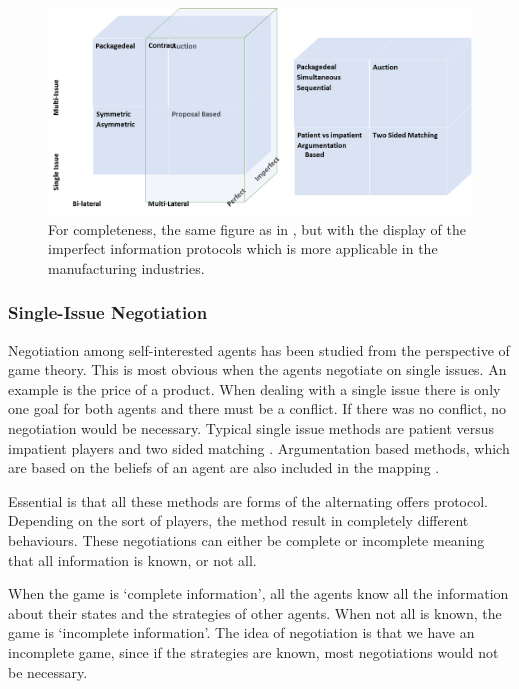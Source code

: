 \begin{figure}[h]
	\centering
	\includegraphics[width=0.9\linewidth]{img/mapping_nego2}
	\caption{For completeness, the same figure as in , but with the display of the imperfect information protocols which is more applicable in the manufacturing industries.}
	\label{fig:mapping_nego2}
\end{figure}

\subsubsection{Single-Issue Negotiation}

Negotiation among self-interested agents has been studied from the perspective of game theory. This is most obvious when the agents negotiate on single issues. An example is the price of a product. When dealing with a single issue there is only one goal for both agents and there must be a conflict. If there was no conflict, no negotiation would be necessary. Typical single issue methods are patient versus impatient players and two sided matching \citep{fatima2014principles}. Argumentation based methods, which are based on the beliefs of an agent are also included in the mapping \citep{li2013automated}.

Essential is that all these methods are forms of the alternating offers protocol. Depending on the sort of players, the method result in completely different behaviours. These negotiations can either be complete or incomplete meaning that all information is known, or not all. 

When the game is `complete information', all the agents know all the information about their states and the strategies of other agents. When not all is known, the game is `incomplete information'. The idea of negotiation is that we have an incomplete game, since if the strategies are known, most negotiations would not be necessary.

